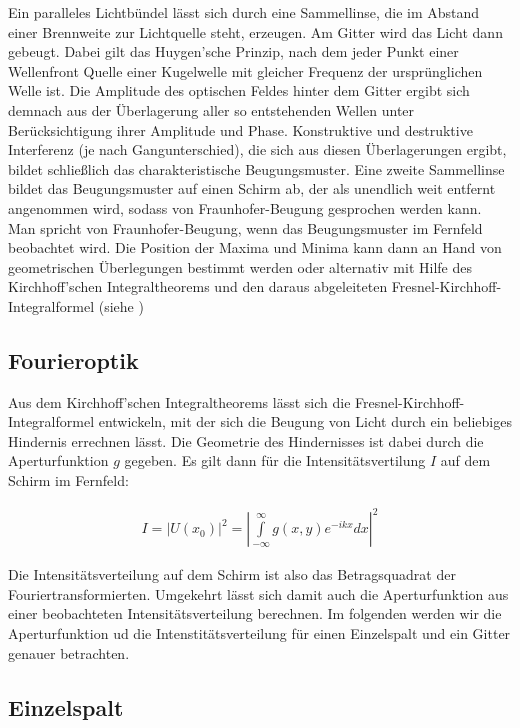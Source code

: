 \documentclass[12pt]{article}
\begin{document}
Ein paralleles Lichtbündel lässt sich durch eine Sammellinse, die im Abstand einer Brennweite zur Lichtquelle steht, erzeugen. Am Gitter wird das Licht dann gebeugt. Dabei gilt das Huygen'sche Prinzip, nach dem jeder Punkt einer Wellenfront Quelle einer Kugelwelle mit gleicher Frequenz der ursprünglichen Welle ist. Die Amplitude des optischen Feldes hinter dem Gitter ergibt sich demnach aus der Überlagerung aller so entstehenden Wellen unter Berücksichtigung ihrer Amplitude und Phase. Konstruktive und destruktive Interferenz (je nach Gangunterschied), die sich aus diesen Überlagerungen ergibt, bildet schließlich das charakteristische Beugungsmuster. Eine zweite Sammellinse bildet das Beugungsmuster auf einen Schirm ab, der als unendlich weit entfernt angenommen wird, sodass von Fraunhofer-Beugung gesprochen werden kann. Man spricht von Fraunhofer-Beugung, wenn das Beugungsmuster im Fernfeld beobachtet wird. Die Position der Maxima und Minima kann dann an Hand von geometrischen Überlegungen bestimmt werden oder alternativ mit Hilfe des Kirchhoff'schen Integraltheorems und den daraus abgeleiteten Fresnel-Kirchhoff-Integralformel (siehe \label{Fourier})

\subsection{Fourieroptik}  

Aus dem  Kirchhoff'schen Integraltheorems lässt sich die Fresnel-Kirchhoff-Integralformel entwickeln, mit der sich die Beugung von Licht durch ein beliebiges Hindernis errechnen lässt. Die Geometrie des Hindernisses ist dabei durch die Aperturfunktion $g$ gegeben. Es gilt dann für die Intensitätsvertilung $I$ auf dem Schirm im Fernfeld: 

\begin{align}
I=|U(x_0)|^2=\left| \int\limits_{-\infty}^{\infty} g(x,y)e^{-ikx}dx \right|^2
\end{align}



Die Intensitätsverteilung auf dem Schirm ist also das Betragsquadrat der Fouriertransformierten. Umgekehrt lässt sich damit auch die Aperturfunktion aus einer beobachteten Intensitätsverteilung berechnen. Im folgenden werden wir die Aperturfunktion ud die Intenstitätsverteilung für einen Einzelspalt und ein Gitter genauer betrachten.

\subsection{Einzelspalt}
       
\end{document}
